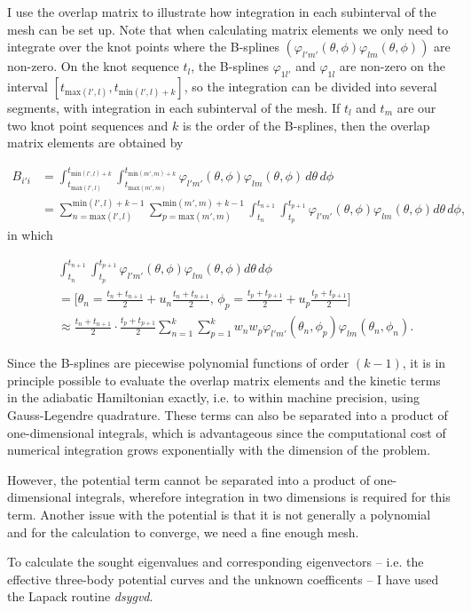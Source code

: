 I use the overlap matrix to illustrate how integration in each subinterval of the mesh can be set up. Note that when calculating matrix elements we only need to integrate over the knot points where the B-splines $(\varphi_{l'm'}(\theta,\phi)\varphi_{lm}(\theta,\phi))$ are non-zero. On the knot sequence $t_{l}$, the B-splines $\varphi_{1l'}$ and $\varphi_{1l}$ are non-zero on the interval $[t_{\text{max}(l',l)},t_{\text{min}(l',l)+k}]$, so the integration can be divided into several segments, with integration in each subinterval of the mesh. If $t_{l}$ and $t_{m}$ are our two knot point sequences and $k$ is the order of the B-splines, then the overlap matrix elements are obtained by

\begin{equation}
\begin{aligned}
B_{i'i} &= \int_{t_{\text{max}(l',l)}}^{t_{\text{min}(l',l)+k}} \int_{t_{\text{max}(m',m)}}^{t_{\text{min}(m',m)+k}} \varphi_{l'm'}(\theta,\phi)\varphi_{lm}(\theta,\phi)\,d\theta\,d\phi \\
&= \sum_{n={\text{max}(l',l)}}^{\text{min}(l',l)+k-1} \sum_{p={\text{max}(m',m)}}^{\text{min}(m',m)+k-1} \int_{t_{n}}^{t_{n+1}} \int_{t_{p}}^{t_{p+1}} \varphi_{l'm'}(\theta,\phi) \varphi_{lm}(\theta,\phi) d\theta\,d\phi,
\end{aligned}
\end{equation}
in which

\begin{equation}
\begin{aligned}
&\int_{t_{n}}^{t_{n+1}} \int_{t_{p}}^{t_{p+1}} \varphi_{l'm'}(\theta,\phi) \varphi_{lm}(\theta,\phi) d\theta\,d\phi\,\\
&=\bigg[\theta_n = \frac{t_n + t_{n+1}}{2} + u_n\frac{t_n + t_{n+1}}{2}, \, \phi_p = \frac{t_p + t_{p+1}}{2} + u_p\frac{t_p + t_{p+1}}{2}\bigg]\\
&\approx \frac{t_n + t_{n+1}}{2} \cdot \frac{t_p + t_{p+1}}{2} \sum_{n=1}^{k}\sum_{p=1}^{k}w_n w_p \varphi_{l'm'}(\theta_n,\phi_p) \varphi_{lm}(\theta_n,\phi_n).
\end{aligned}
\end{equation}

Since the B-splines are piecewise polynomial functions of order $(k-1)$, it is in principle possible to evaluate the overlap matrix elements and the kinetic terms in the adiabatic Hamiltonian exactly, i.e. to within machine precision, using Gauss-Legendre quadrature. These terms can also be separated into a product of one-dimensional integrals, which is advantageous since the computational cost of numerical integration grows exponentially with the dimension of the problem.

However, the potential term cannot be separated into a product of one-dimensional integrals, wherefore integration in two dimensions is required for this term. Another issue with the potential is that it is not generally a polynomial and for the calculation to converge, we need a fine enough mesh. 
 
To calculate the sought eigenvalues and corresponding eigenvectors -- i.e. the effective three-body potential curves and the unknown coefficents -- I have used the Lapack routine \textit{dsygvd}.
